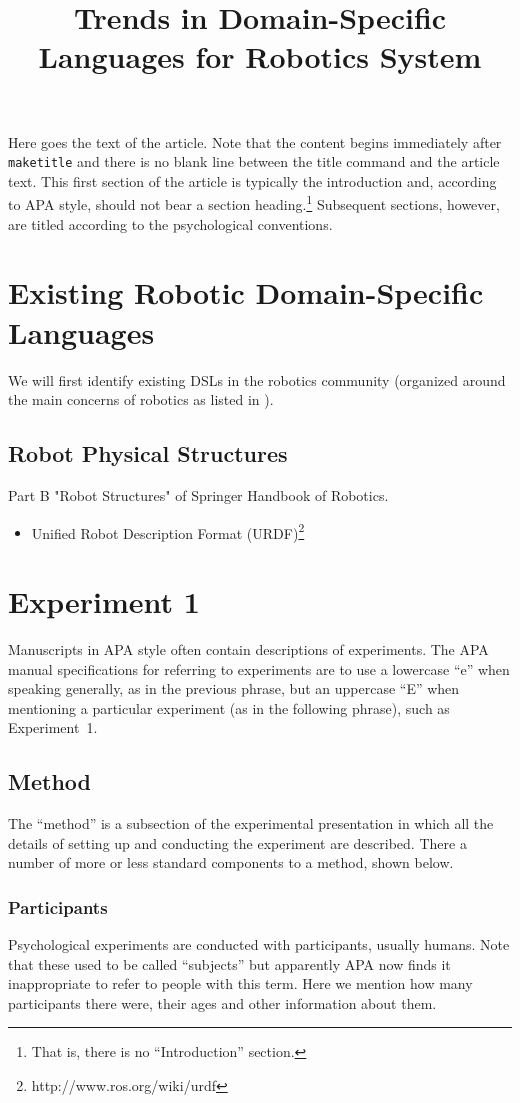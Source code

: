 \documentclass[man]{apa}
\title{Trends in Domain-Specific Languages for Robotics System}
\begin{document}
\maketitle                            
Here goes the text of the article. Note that the content begins immediately after \texttt{maketitle} and there is no blank line between the title command and the article text. This first section of the article is typically the introduction and, according to APA style, should not bear a section heading.\footnote{That is, there is no ``Introduction'' section.} Subsequent sections, however, are titled according to the psychological conventions.

\section{Existing Robotic Domain-Specific Languages}
We will first identify existing DSLs in the robotics community (organized around the main concerns of robotics as listed in \cite{SpringerHandbook:2008fk}).
\subsection{Robot Physical Structures}
Part B "Robot Structures" of Springer Handbook of Robotics.
\begin{itemize}
\item Unified Robot Description Format (URDF){\footnote{http://www.ros.org/wiki/urdf}}
\end{itemize}

\section{Experiment 1} 
Manuscripts in APA style often contain descriptions of experiments.  The APA manual specifications for referring to experiments are to use a lowercase ``e'' when speaking generally, as in the previous phrase, but an uppercase ``E'' when mentioning a particular experiment (as in the following phrase), such as Experiment~1.

\subsection{Method}
The ``method'' is a subsection of the experimental presentation in which all the details of setting up and conducting the experiment are described.  There a number of more or less standard components to a method, shown below.
\subsubsection{Participants}
Psychological experiments are conducted with participants, usually humans. Note that these used to be called ``subjects'' but apparently APA now finds it inappropriate to refer to people with this term.  Here we mention how many participants there were, their ages and other information about them.
\end{document}
